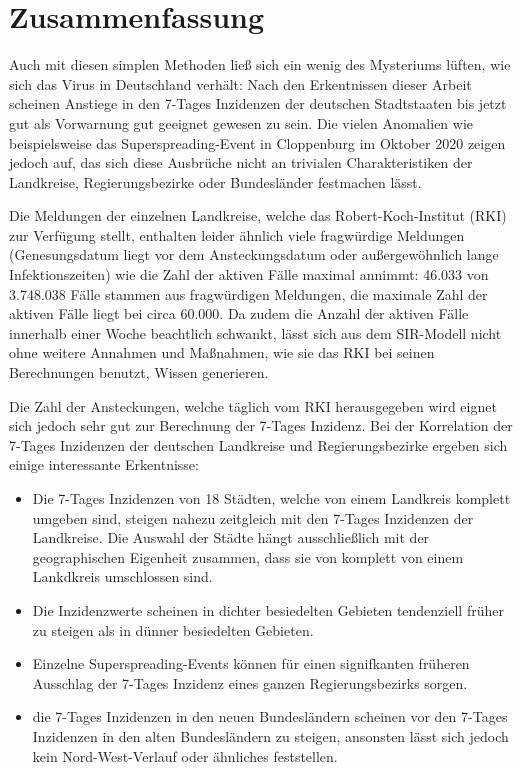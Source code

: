 \chapter{Zusammenfassung}\label{chap:Zusammenfassun}
Auch mit diesen simplen Methoden ließ sich ein wenig des Mysteriums lüften, wie sich das Virus in Deutschland verhält: Nach den Erkentnissen dieser Arbeit scheinen Anstiege in den 7-Tages Inzidenzen der deutschen Stadtstaaten bis jetzt gut als Vorwarnung gut geeignet gewesen zu sein. Die vielen Anomalien wie beispielsweise das Superspreading-Event in Cloppenburg im Oktober 2020 zeigen jedoch auf, das sich diese Ausbrüche nicht an trivialen Charakteristiken der Landkreise, Regierungsbezirke oder Bundesländer festmachen lässt.

Die Meldungen der einzelnen Landkreise, welche das Robert-Koch-Institut (RKI) zur Verfügung stellt, enthalten leider ähnlich viele fragwürdige Meldungen (Genesungsdatum liegt vor dem Ansteckungsdatum oder außergewöhnlich lange Infektionszeiten) wie die Zahl der aktiven Fälle maximal annimmt: 46.033 von 3.748.038 Fälle stammen aus fragwürdigen Meldungen, die maximale Zahl der aktiven Fälle liegt bei circa 60.000. Da zudem die Anzahl der aktiven Fälle innerhalb einer Woche beachtlich schwankt, lässt sich aus dem SIR-Modell nicht ohne weitere Annahmen und Maßnahmen, wie sie das RKI bei seinen Berechnungen benutzt, Wissen generieren.

Die Zahl der Ansteckungen, welche täglich vom RKI herausgegeben wird eignet sich jedoch sehr gut zur Berechnung der 7-Tages Inzidenz.
Bei der Korrelation der 7-Tages Inzidenzen der deutschen Landkreise und Regierungsbezirke ergeben sich einige interessante Erkentnisse:
\begin{itemize}
    \item Die 7-Tages Inzidenzen von 18 Städten, welche von einem Landkreis komplett umgeben sind, steigen nahezu zeitgleich mit den 7-Tages Inzidenzen der Landkreise. Die Auswahl der Städte hängt ausschließlich mit der geographischen Eigenheit zusammen, dass sie von komplett von einem Lankdkreis umschlossen sind.
    \item Die Inzidenzwerte scheinen in dichter besiedelten Gebieten tendenziell früher zu steigen als in dünner besiedelten Gebieten.
    \item Einzelne Superspreading-Events können für einen signifkanten früheren Ausschlag der 7-Tages Inzidenz eines ganzen Regierungsbezirks sorgen.
    \item die 7-Tages Inzidenzen in den neuen Bundesländern scheinen vor den 7-Tages Inzidenzen in den alten Bundesländern zu steigen, ansonsten lässt sich jedoch kein Nord-West-Verlauf oder ähnliches feststellen.
\end{itemize}